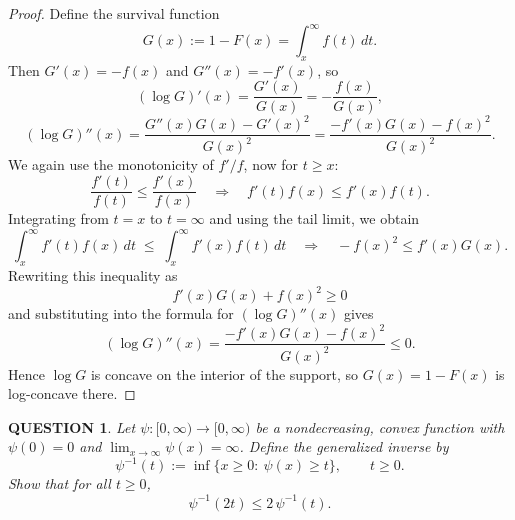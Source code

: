 \documentclass[12pt]{article}
\renewcommand{\(}{\left(}%
\renewcommand{\)}{\right)}%
\renewcommand{\[}{\left[}%
\renewcommand{\]}{\right]}%
\newtheorem{question}{QUESTION}[section]}
\newtheorem{proof}{Proof.}}
\begin{document}
\begin{proof}
Define the survival function
\begin{equation*}
G(x) := 1-F(x) = \int_x^\infty f(t)\,dt.
\end{equation*}
Then $G'(x)=-f(x)$ and $G''(x)=-f'(x)$, so
\begin{equation*}
(\log G)'(x) = \frac{G'(x)}{G(x)} = -\frac{f(x)}{G(x)} ,
\end{equation*}
\begin{equation*}
(\log G)''(x)
= \frac{G''(x)G(x)-G'(x)^2}{G(x)^2}
= \frac{-f'(x)G(x)-f(x)^2}{G(x)^2}.
\end{equation*}
We again use the monotonicity of $f'/f$, now for $t\ge x$:
\begin{equation*}
\frac{f'(t)}{f(t)} \le \frac{f'(x)}{f(x)} \quad\Rightarrow\quad
f'(t) f(x) \le f'(x) f(t).
\end{equation*}
Integrating from $t=x$ to $t=\infty$ and using the tail limit, we obtain
\begin{equation*}
\int_x^\infty f'(t) f(x)\,dt
\;\le\;
\int_x^\infty f'(x) f(t)\,dt
\quad\Longrightarrow\quad
- f(x)^2 \le f'(x) G(x).
\end{equation*}
Rewriting this inequality as
\begin{equation*}
f'(x)G(x)+f(x)^2 \ge 0
\end{equation*}
and substituting into the formula for $(\log G)''(x)$ gives
\begin{equation*}
(\log G)''(x)=\frac{-f'(x)G(x)-f(x)^2}{G(x)^2}\le 0.
\end{equation*}
Hence $\log G$ is concave on the interior of the support, so $G(x)=1-F(x)$
is log-concave there.
\end{proof}

\begin{question}
Let $\psi:[0,\infty)\to[0,\infty)$ be a nondecreasing, convex function with
$\psi(0)=0$ and $\lim_{x\to\infty}\psi(x)=\infty$.
Define the generalized inverse by
\begin{equation*}
\psi^{-1}(t)
:=\inf\{x\ge 0:\ \psi(x)\ge t\},\qquad t\ge 0.
\end{equation*}
Show that for all $t\ge 0$,
\begin{equation*}
\psi^{-1}(2t)\le 2\,\psi^{-1}(t).
\end{equation*}
\end{question}
\end{document}
